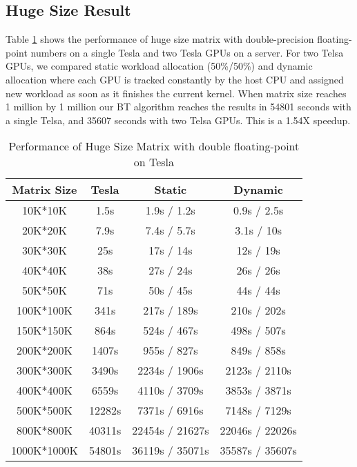 \subsection{Huge Size Result}
Table \ref{tab:hugeResultTesla} shows the performance of huge size matrix with double-precision floating-point numbers on a single Tesla and two Tesla GPUs on a server. For two Telsa GPUs, we compared static workload allocation (50\%/50\%) and dynamic allocation where each GPU is tracked constantly by the host CPU and assigned new workload as soon as it finishes the current kernel. 
When matrix size reaches 1 million by 1
million our BT algorithm reaches the results in 54801 seconds
with a single Telsa, and 35607 seconds with two Telsa GPUs. This is a 1.54X speedup.
\begin{table}[h]
\vspace{-0.3in}
\caption{Performance of Huge Size Matrix with double floating-point on Tesla}
\vspace{-0.1in}
\centering
\begin{tabular}{|c|c|c|c|}
\hline
Matrix Size &  Tesla  & Static & Dynamic \\ \hline
 10K*10K    &   1.5s  &  1.9s / 1.2s &  0.9s / 2.5s \\ \hline
 20K*20K    &   7.9s  &  7.4s / 5.7s &  3.1s / 10s \\ \hline
 30K*30K    &    25s  &   17s /  14s &  12s  / 19s \\ \hline
 40K*40K    &    38s  &   27s /  24s &  26s / 26s \\ \hline
 50K*50K    &    71s  &   50s /  45s &  44s / 44s \\ \hline
 100K*100K  &   341s  &  217s / 189s &  210s / 202s \\ \hline
 150K*150K  &   864s  &  524s / 467s &  498s / 507s \\ \hline
 200K*200K  &  1407s  &  955s / 827s &  849s / 858s \\ \hline
 300K*300K  &  3490s  & 2234s / 1906s & 2123s / 2110s\\ \hline
 400K*400K  &  6559s  & 4110s / 3709s & 3853s / 3871s\\ \hline
 500K*500K  & 12282s  & 7371s / 6916s  & 7148s / 7129s\\ \hline
 800K*800K  & 40311s  & 22454s / 21627s &  22046s / 22026s   \\ \hline
 1000K*1000K & 54801s  & 36119s / 35071s   &  35587s / 35607s \\ \hline
\end{tabular}
\label{tab:hugeResultTesla}
\vspace{-0.2in}
\end{table}

